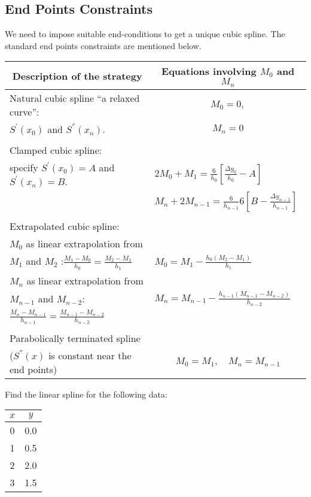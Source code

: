 \documentclass[12pt,class=book,crop=false]{standalone}
\begin{document}
\subsection{End Points Constraints}
We need to impose suitable end-conditions to get a unique cubic spline. The standard end points constraints are mentioned below.
\begin{table}[H]
	\centering
	\begin{tabular}{ll}
		\toprule
		\multicolumn{1}{c}{Description of the strategy}&\multicolumn{1}{c}{ Equations involving $ M_0 $ and $ M_n $ }\\\midrule
		
        Natural cubic spline ``a relaxed curve'': & \multicolumn{1}{c}{$ M_0=0,$}\\
		$ S^{'}(x_0) $ and $ S^{''}(x_n )$. & \multicolumn{1}{c}{$M_n=0 $ }\\%
		&\\
        Clamped cubic spline:& \\
		specify $ S^{'} (x_0) = A $ and $ S^{'} (x_n) = B $. & $\displaystyle 2M_0+M_1 =\frac{6}{h_0}\left[ \frac{\Delta y_0}{h_0}-A \right]$\\
					& $\displaystyle M_n+2M_{n-1} =\frac{6}{h_{n-1}}6\left[ B-\frac{\Delta y_{n-1}}{h_{n-1}} \right] $      \\%
		& \\
        Extrapolated cubic spline:& \\
		$ M_0 $ as linear extrapolation from & \\
		$ M_1 $ and $ M_2 $ :$ \frac{M_1-M_0}{h_0}=\frac{M_2-M_1}{h_1} $ & $\displaystyle M_0 =M_1-\frac{h_0 (M_2-M_1)}{h_1}$\\
		$ M_n $ as linear extrapolation from & \\
		$ M_{n-1} $ and $ M_{n-2} $: & $\displaystyle M_n  =M_{n-1}-\frac{h_{n-1}(M_{n-1}-M_{n-2})}{h_{n-2}}$\\
		$\displaystyle \frac{M_n-M_{n-1}}{h_{n-1}}=\frac{M_{n-1}-M_{n-2}}{h_{n-2}} $ & \\%
		& \\
        Parabolically terminated spline & \\
		($ S^{''}(x) $ is constant near the end points)&\multicolumn{1}{c}{ $ M_0=M_1,\quad M_n=M_{n-1} $}\\\bottomrule
	\end{tabular}
\end{table}
\begin{prob}
	Find the linear spline for the following data:
	\begin{table}[H]
		\centering
		\begin{tabular}{cc}
			\toprule
			$ x $	&
			$ y $	\\\midrule
			0	&
			0.0	\\
			1	&
			0.5	\\
			2	&
			2.0	\\
			3&
			1.5 \\\bottomrule
		\end{tabular}
	\end{table}
\end{prob}
\end{document}
